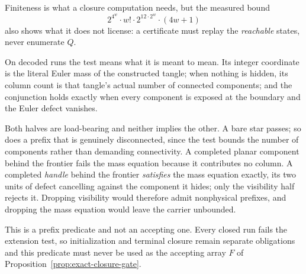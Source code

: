 Finiteness is what a closure computation needs, but the measured bound
\[
 2^{4^{w}}\cdot w!\cdot 2^{12\cdot 2^{w}}\cdot(4w+1)
\]
also shows what it does not license: a certificate must replay the
\emph{reachable} states, never enumerate $Q$.

On decoded runs the test means what it is meant to mean. Its integer
coordinate is the literal Euler mass of the constructed tangle; when nothing
is hidden, its column count is that tangle's actual number of connected
components; and the conjunction holds exactly when every component is exposed
at the boundary and the Euler defect vanishes.

Both halves are load-bearing and neither implies the other. A bare star
passes; so does a prefix that is genuinely disconnected, since the test
bounds the number of components rather than demanding connectivity. A
completed planar component behind the frontier fails the mass equation
because it contributes no column. A completed \emph{handle} behind the
frontier \emph{satisfies} the mass equation exactly, its two units of defect
cancelling against the component it hides; only the visibility half rejects
it. Dropping visibility would therefore admit nonphysical prefixes, and
dropping the mass equation would leave the carrier unbounded.

This is a prefix predicate and not an accepting one. Every closed run fails
the extension test, so initialization and terminal closure remain separate
obligations and this predicate must never be used as the accepting array $F$
of Proposition~\ref{prop:exact-closure-gate}.


